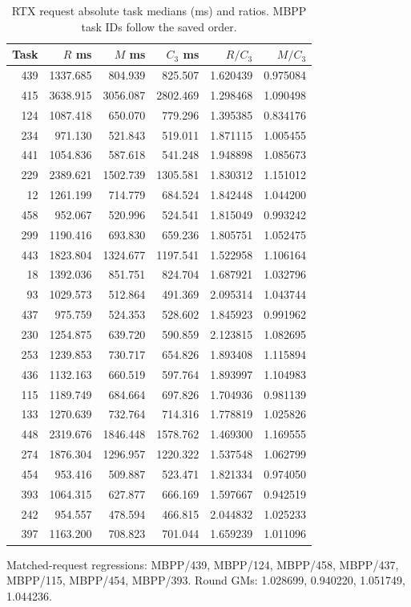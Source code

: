 \begingroup\small
\begin{table}[t]\centering
\caption{RTX request absolute task medians (ms) and ratios. MBPP task IDs follow the saved order.}\label{tab:rtx_task_request}
\begin{tabular}{@{}rrrrrr@{}}
\toprule
Task & $R$ ms & $M$ ms & $C_3$ ms & $R/C_3$ & $M/C_3$\\\midrule
439 & 1337.685 & 804.939 & 825.507 & 1.620439 & 0.975084\\
415 & 3638.915 & 3056.087 & 2802.469 & 1.298468 & 1.090498\\
124 & 1087.418 & 650.070 & 779.296 & 1.395385 & 0.834176\\
234 & 971.130 & 521.843 & 519.011 & 1.871115 & 1.005455\\
441 & 1054.836 & 587.618 & 541.248 & 1.948898 & 1.085673\\
229 & 2389.621 & 1502.739 & 1305.581 & 1.830312 & 1.151012\\
12 & 1261.199 & 714.779 & 684.524 & 1.842448 & 1.044200\\
458 & 952.067 & 520.996 & 524.541 & 1.815049 & 0.993242\\
299 & 1190.416 & 693.830 & 659.236 & 1.805751 & 1.052475\\
443 & 1823.804 & 1324.677 & 1197.541 & 1.522958 & 1.106164\\
18 & 1392.036 & 851.751 & 824.704 & 1.687921 & 1.032796\\
93 & 1029.573 & 512.864 & 491.369 & 2.095314 & 1.043744\\
437 & 975.759 & 524.353 & 528.602 & 1.845923 & 0.991962\\
230 & 1254.875 & 639.720 & 590.859 & 2.123815 & 1.082695\\
253 & 1239.853 & 730.717 & 654.826 & 1.893408 & 1.115894\\
436 & 1132.163 & 660.519 & 597.764 & 1.893997 & 1.104983\\
115 & 1189.749 & 684.664 & 697.826 & 1.704936 & 0.981139\\
133 & 1270.639 & 732.764 & 714.316 & 1.778819 & 1.025826\\
448 & 2319.676 & 1846.448 & 1578.762 & 1.469300 & 1.169555\\
274 & 1876.304 & 1296.957 & 1220.322 & 1.537548 & 1.062799\\
454 & 953.416 & 509.887 & 523.471 & 1.821334 & 0.974050\\
393 & 1064.315 & 627.877 & 666.169 & 1.597667 & 0.942519\\
242 & 954.557 & 478.594 & 466.815 & 2.044832 & 1.025233\\
397 & 1163.200 & 708.823 & 701.044 & 1.659239 & 1.011096\\
\bottomrule\end{tabular}

\par\smallskip\begin{minipage}{\linewidth}Matched-request regressions: MBPP/439, MBPP/124, MBPP/458, MBPP/437, MBPP/115, MBPP/454, MBPP/393. Round GMs: 1.028699, 0.940220, 1.051749, 1.044236.
\end{minipage}
\end{table}
\endgroup
